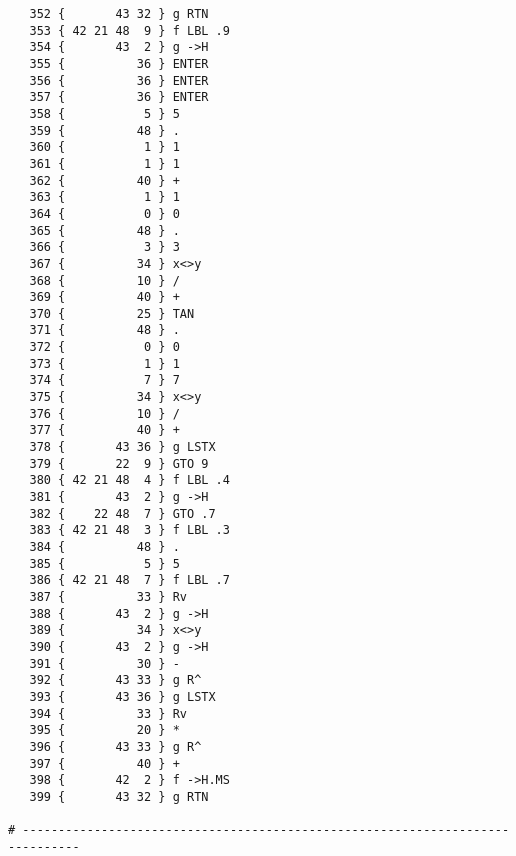\documentclass[english,a4paper,onepage, 10pt]{scrbook}
\begin{document}
\begin{multicols}{2}
\begin{lstlisting}
   352 {       43 32 } g RTN
   353 { 42 21 48  9 } f LBL .9
   354 {       43  2 } g ->H
   355 {          36 } ENTER
   356 {          36 } ENTER
   357 {          36 } ENTER
   358 {           5 } 5
   359 {          48 } .
   360 {           1 } 1
   361 {           1 } 1
   362 {          40 } +
   363 {           1 } 1
   364 {           0 } 0
   365 {          48 } .
   366 {           3 } 3
   367 {          34 } x<>y
   368 {          10 } /
   369 {          40 } +
   370 {          25 } TAN
   371 {          48 } .
   372 {           0 } 0
   373 {           1 } 1
   374 {           7 } 7
   375 {          34 } x<>y
   376 {          10 } /
   377 {          40 } +
   378 {       43 36 } g LSTX
   379 {       22  9 } GTO 9
   380 { 42 21 48  4 } f LBL .4
   381 {       43  2 } g ->H
   382 {    22 48  7 } GTO .7
   383 { 42 21 48  3 } f LBL .3
   384 {          48 } .
   385 {           5 } 5
   386 { 42 21 48  7 } f LBL .7
   387 {          33 } Rv
   388 {       43  2 } g ->H
   389 {          34 } x<>y
   390 {       43  2 } g ->H
   391 {          30 } -
   392 {       43 33 } g R^
   393 {       43 36 } g LSTX
   394 {          33 } Rv
   395 {          20 } *
   396 {       43 33 } g R^
   397 {          40 } +
   398 {       42  2 } f ->H.MS
   399 {       43 32 } g RTN

# ------------------------------------------------------------------------------ 
  
  
\end{lstlisting}
\end{multicols}
\newpage
\appendix
\end{document}
